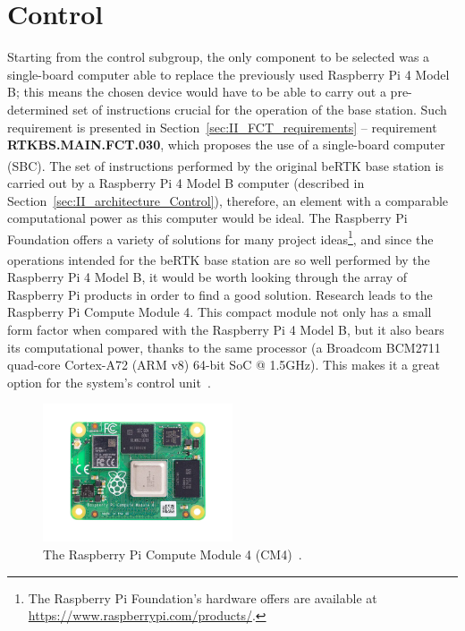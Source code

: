 \section{Control}\label{sec:311_Control}

Starting from the control subgroup, the only component to be selected was a single-board computer able to replace the previously used Raspberry Pi 4 Model B; this means the chosen device would have to be able to carry out a pre-determined set of instructions crucial for the operation of the base station. Such requirement is presented in Section~\ref{sec:II_FCT_requirements} -- requirement \textbf{RTKBS.MAIN.FCT.030}, which proposes the use of a single-board computer (SBC).
The set of instructions performed by the original beRTK\textsuperscript{\textregistered} base station is carried out by a Raspberry Pi 4 Model B computer (described in Section~\ref{sec:II_architecture_Control}), therefore, an element with a comparable computational power as this computer would be ideal. The Raspberry Pi Foundation offers a variety of solutions for many project ideas\footnote[13]{The Raspberry Pi Foundation's hardware offers are available at \url{https://www.raspberrypi.com/products/}.}, and since the operations intended for the beRTK\textsuperscript{\textregistered} base station are so well performed by the Raspberry Pi 4 Model B, it would be worth looking through the array of Raspberry Pi products in order to find a good solution. Research leads to the Raspberry Pi Compute Module 4.
This compact module not only has a small form factor when compared with the Raspberry Pi 4 Model B, but it also bears its computational power, thanks to the same processor (a Broadcom BCM2711 quad-core Cortex-A72 (ARM v8) 64-bit SoC @ 1.5GHz). This makes it a great option for the system's control unit~\cite{CM4}.

\begin{figure}[h]
	\centering
	\includegraphics[width=0.5\textwidth]{Chapters/Figures/CM4.png}
	\caption{The Raspberry Pi Compute Module 4 (CM4)~\cite{CM4}.}
	\label{fig:CM4}
\end{figure}

